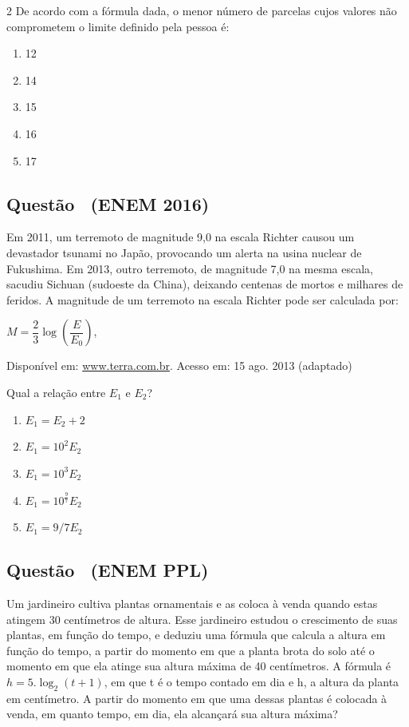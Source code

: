 \documentclass[12pt]{article}
\newcommand{\vermelho}[1]{{\color{red}#1}}
\newcounter{questao}
\newcommand{\novaquestao}[1]{%
  \stepcounter{questao}%
  \subsection*{Questão \thequestao\ (#1)}%
}
\begin{document}
\begin{multicols}{2}
        De acordo com a fórmula dada, o menor número de parcelas cujos valores não comprometem o limite definido pela pessoa é:
        
        \begin{enumerate}[label=(\Alph*), noitemsep]
        	\item 12
        	\item 14
        	\item 15
        	\item \vermelho{16} %
        	\item 17 
        \end{enumerate}
        
        \novaquestao{ENEM 2016} Em 2011, um terremoto de magnitude 9,0 na escala Richter causou um devastador tsunami no Japão, provocando um alerta na usina nuclear de
        Fukushima. Em 2013, outro terremoto, de magnitude 7,0 na mesma escala, sacudiu Sichuan (sudoeste da China), deixando centenas de mortos e milhares de feridos. A magnitude de um terremoto na escala Richter pode ser calculada por:
        
        \begin{center}
        	$M=\dfrac{2}{3}\log\left(\dfrac{E}{E_{0}}\right)$,
        \end{center}
        
        \begin{flushleft}
        	\noindent
        	Disponível em: \url{www.terra.com.br}. Acesso em: 15 ago. 2013 (adaptado)
        \end{flushleft} Qual a relação entre $E_{1}$ e $E_{2}$?
        
        \begin{enumerate}[label=(\Alph*), noitemsep]
        	\item $E_{1}=E_{2}+2$
        	\item $E_{1}=10^{2}E_{2}$
        	\item \vermelho{$E_{1}=10^{3}E_{2}$} %
        	\item $E_{1}=10^{\frac{9}{7}}E_{2}$
        	\item $E_{1}={9}/{7}E_{2}$
        \end{enumerate}
        
        
        \novaquestao{ENEM PPL} Um jardineiro cultiva plantas
        ornamentais e as coloca à venda quando estas atingem
        30 centímetros de altura. Esse jardineiro estudou o
        crescimento de suas plantas, em função do tempo, e
        deduziu uma fórmula que calcula a altura em função
        do tempo, a partir do momento em que a planta brota
        do solo até o momento em que ela atinge sua altura
        máxima de 40 centímetros. A fórmula é $h=5.\log_{2}(t+1)$, em que t é o tempo contado em dia e h, a altura da
        planta em centímetro. A partir do momento em que uma dessas plantas
        é colocada à venda, em quanto tempo, em dia, ela
        alcançará sua altura máxima?
        

\end{multicols}
\end{document}
